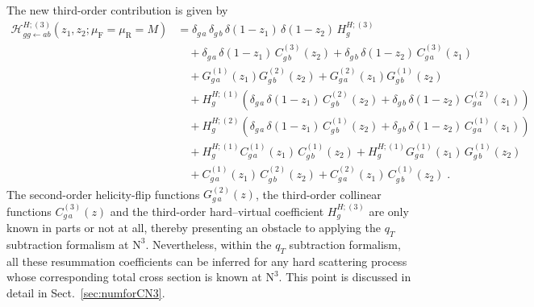 \documentclass[12pt]{article}
\DeclareRobustCommand{\nn}{\nonumber}
\DeclareRobustCommand{\mur}{\ensuremath{\mu_{\mathrm{R}}}\xspace}
\DeclareRobustCommand{\muf}{\ensuremath{\mu_{\mathrm{F}}}\xspace}
\DeclareRobustCommand{\qt}{\ensuremath{q_T}\xspace}
\DeclareRobustCommand{\cH}{\ensuremath{\mathcal{H}}}
\DeclareRobustCommand{\LO}{\text{LO}\xspace}
\DeclareRobustCommand{\N}[1]{\ensuremath{\text{N}^{#1}}} %
\begin{document}
The new third-order contribution is given by
\begin{align}
  \cH^{H;(3)}_{gg\gets ab}(z_1,z_2; \muf=\mur=M)
  &=
  \delta_{g\,a} \,\delta_{g\,b} \,\delta(1-z_1)\,\delta(1-z_2)\,H^{H;(3)}_g
  \nn\\&\quad
  +\delta_{g\,a} \,\delta(1-z_1)\,C^{(3)}_{g\,b}(z_2)
  +\delta_{g\,b} \,\delta(1-z_2)\,C^{(3)}_{g\,a}(z_1)
  \nn\\&\quad
  +G^{(1)}_{g\,a}(z_1) G^{(2)}_{g\,b}(z_2)
  +G^{(2)}_{g\,a}(z_1) G^{(1)}_{g\,b}(z_2)
  \nn\\&\quad
  +H^{H;(1)}_g\left(
  \delta_{g\,a} \,\delta(1-z_1) \,C^{(2)}_{g\,b}(z_2) +
  \delta_{g\,b} \,\delta(1-z_2) \,C^{(2)}_{g\,a}(z_1)
  \right) 
  \nn\\&\quad
  +H^{H;(2)}_g\left(
  \delta_{g\,a} \,\delta(1-z_1) \,C^{(1)}_{g\,b}(z_2) +
  \delta_{g\,b} \,\delta(1-z_2) \,C^{(1)}_{g\,a}(z_1)
  \right)
  \nn\\&\quad
  + H^{H;(1)}_g  C^{(1)}_{g\,a}(z_1) \, C^{(1)}_{g\,b}(z_2) 
  + H^{H;(1)}_g  G^{(1)}_{g\,a}(z_1) \, G^{(1)}_{g\,b}(z_2) 
  \nn\\&\quad
  + C^{(1)}_{g\,a}(z_1) \, C^{(2)}_{g\,b}(z_2)
  + C^{(2)}_{g\,a}(z_1) \, C^{(1)}_{g\,b}(z_2) \;.
  \label{H3}
\end{align}
The second-order helicity-flip functions $G^{(2)}_{g\,a}(z)$, the third-order collinear functions $C^{(3)}_{g\,a}(z)$ and the third-order hard--virtual coefficient $H^{H;(3)}_g$ are only known in parts or not at all, thereby presenting an obstacle to applying the $\qt$ subtraction formalism at \N3\LO.
Nevertheless, within the $\qt$ subtraction  formalism, all these resummation coefficients can be inferred for any hard scattering process whose corresponding total cross section is known at \N3\LO. 
This point is discussed in detail in Sect.~\ref{sec:numforCN3}.
\end{document}
